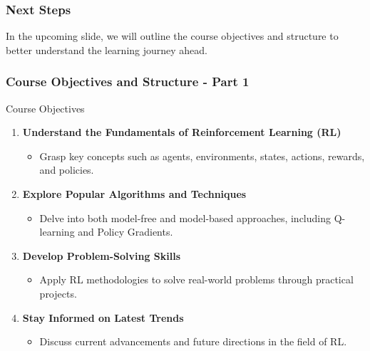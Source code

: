 \documentclass[aspectratio=169]{beamer}
\begin{document}
\begin{frame}[fragile]
    \frametitle{Next Steps}
    In the upcoming slide, we will outline the course objectives and structure to better understand the learning journey ahead.
\end{frame}

\begin{frame}[fragile]
  \frametitle{Course Objectives and Structure - Part 1}

  \begin{block}{Course Objectives}
    \begin{enumerate}
      \item \textbf{Understand the Fundamentals of Reinforcement Learning (RL)}
        \begin{itemize}
          \item Grasp key concepts such as agents, environments, states, actions, rewards, and policies.
        \end{itemize}
      \item \textbf{Explore Popular Algorithms and Techniques}
        \begin{itemize}
          \item Delve into both model-free and model-based approaches, including Q-learning and Policy Gradients.
        \end{itemize}
      \item \textbf{Develop Problem-Solving Skills}
        \begin{itemize}
          \item Apply RL methodologies to solve real-world problems through practical projects.
        \end{itemize}
      \item \textbf{Stay Informed on Latest Trends}
        \begin{itemize}
          \item Discuss current advancements and future directions in the field of RL.
        \end{itemize}
    \end{enumerate}
  \end{block}
\end{frame}
\end{document}
